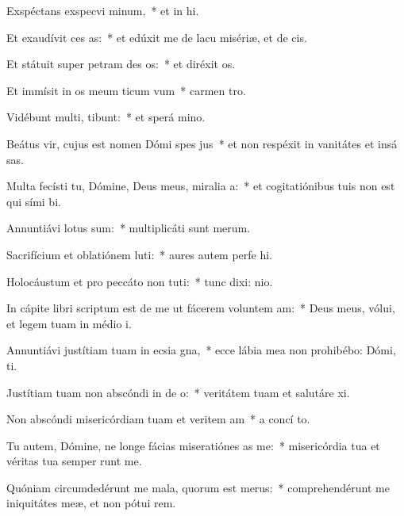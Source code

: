 \item Exspéctans exspecvi minum,~* et in hi.
\item Et exaudívit ces as:~* et edúxit me de lacu misériæ, et de  cis.
\item Et státuit super petram des os:~* et diréxit  os.
\item Et immísit in os meum ticum vum~* carmen  tro.
\item Vidébunt multi,  tibunt:~* et sperá  mino.
\item Beátus vir, cujus est nomen Dómi spes jus~* et non respéxit in vanitátes et insá sas.
\item Multa fecísti tu, Dómine, Deus meus, miralia a:~* et cogitatiónibus tuis non est qui sími  bi.
\item Annuntiávi  lotus sum:~* multiplicáti sunt  merum.
\item Sacrifícium et oblatiónem luti:~* aures autem perfe hi.
\item Holocáustum et pro peccáto non tuti:~* tunc dixi:  nio.
\item In cápite libri scriptum est de me ut fácerem voluntem am:~* Deus meus, vólui, et legem tuam in médio  i.
\item Annuntiávi justítiam tuam in ecsia gna,~* ecce lábia mea non prohibébo: Dómi,  ti.
\item Justítiam tuam non abscóndi in de o:~* veritátem tuam et salutáre  xi.
\item Non abscóndi misericórdiam tuam et veritem am~* a concí to.
\item Tu autem, Dómine, ne longe fácias miseratiónes as  me:~* misericórdia tua et véritas tua semper runt me.
\item Quóniam circumdedérunt me mala, quorum  est merus:~* comprehendérunt me iniquitátes meæ, et non pótui  rem.
